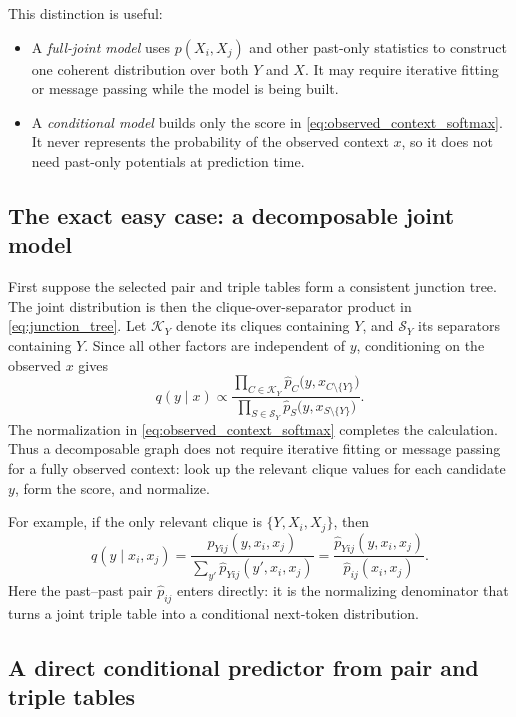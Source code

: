 \documentclass[11pt]{article}
\newcommand{\1}{\mathbf 1}
\newcommand{\hatp}{\widehat p}
\begin{document}
This distinction is useful:
\begin{itemize}
  \item A \emph{full-joint model} uses \(p(X_i,X_j)\) and other past-only
  statistics to construct one coherent distribution over both \(Y\) and
  \(X\).  It may require iterative fitting or message passing while the model
  is being built.
  \item A \emph{conditional model} builds only the score in
  \eqref{eq:observed_context_softmax}.  It never represents the probability of
  the observed context \(x\), so it does not need past-only potentials at
  prediction time.
\end{itemize}

\subsection{The exact easy case: a decomposable joint model}

First suppose the selected pair and triple tables form a consistent junction
tree.  The joint distribution is then the clique-over-separator product in
\eqref{eq:junction_tree}.  Let \(\mathcal K_Y\) denote its cliques containing
\(Y\), and \(\mathcal S_Y\) its separators containing \(Y\).  Since all other
factors are independent of \(y\), conditioning on the observed \(x\) gives
\begin{equation}
  q(y\mid x)
  \propto
  \frac{
    \displaystyle\prod_{C\in\mathcal K_Y}
    \hatp_C\bigl(y,x_{C\setminus\{Y\}}\bigr)}
  {
    \displaystyle\prod_{S\in\mathcal S_Y}
    \hatp_S\bigl(y,x_{S\setminus\{Y\}}\bigr)
  }.
  \label{eq:junction_conditional}
\end{equation}
The normalization in \eqref{eq:observed_context_softmax} completes the
calculation.  Thus a decomposable graph does not require iterative fitting or
message passing for a fully observed context: look up the relevant clique
values for each candidate \(y\), form the score, and normalize.

For example, if the only relevant clique is
\(\{Y,X_i,X_j\}\), then
\[
  q(y\mid x_i,x_j)
  =
  \frac{\hatp_{Yij}(y,x_i,x_j)}
       {\sum_{y'}\hatp_{Yij}(y',x_i,x_j)}
  =
  \frac{\hatp_{Yij}(y,x_i,x_j)}
       {\hatp_{ij}(x_i,x_j)}.
  \label{eq:triple_conditional}
\]
Here the past--past pair \(\hatp_{ij}\) enters directly: it is the
normalizing denominator that turns a joint triple table into a conditional
next-token distribution.

\subsection{A direct conditional predictor from pair and triple tables}
\end{document}
